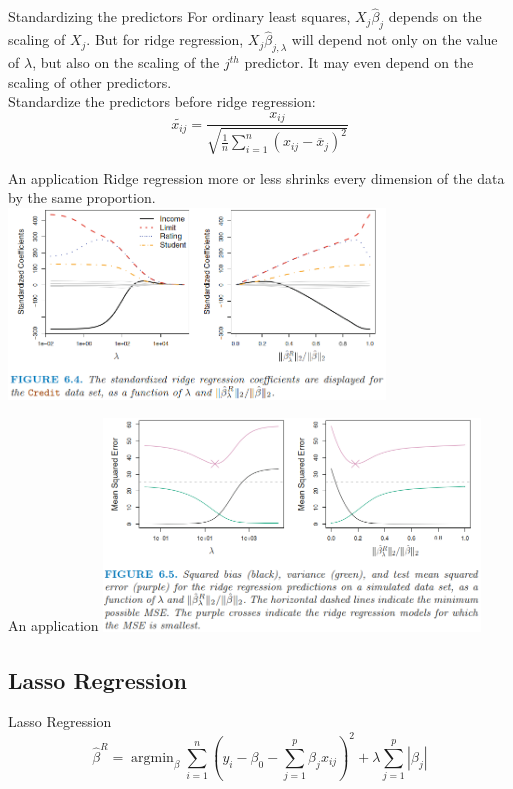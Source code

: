 \documentclass{beamer}
\begin{document}
	\begin{frame}{Standardizing the predictors}
		For ordinary least squares, $X_j\hat{\beta}_j$ depends on the scaling of $X_j$. But for ridge regression, $X_j\hat{\beta}_{j,\lambda}$ will depend not only on the value of $\lambda$, but also on the scaling of the
		$j^{th}$ predictor. It may even depend on the scaling of other predictors. \\
		Standardize the predictors before ridge regression:
		\[
		\tilde{x_{ij}}=\frac{x_{ij}}{\sqrt{\frac{1}{n}\sum_{i=1}^{n}(x_{ij}-\overline{x}_j) ^2}}
		\]
	\end{frame}
	
	\begin{frame}{An application}
		Ridge regression more or less shrinks every dimension of the data by the same proportion. \\
		\vspace{0.5cm}
		\includegraphics[width=10cm]{figure_6.4.png}
	\end{frame}
	
	\begin{frame}{An application}
		\includegraphics[width=10cm]{figure_6.5.png}
	\end{frame}
	
	\subsection{Lasso Regression}
	\begin{frame}{Lasso Regression}
		\[
		\hat{\beta}^R = \mathop{\arg\min}_{\beta} \sum_{i=1}^{n} (y_i-\beta_0-\sum_{j=1}^{p} \beta_jx_{ij})^2+\lambda\sum_{j=1}^{p}|\beta_j|
		\]
	\end{frame}
	
\end{document}

